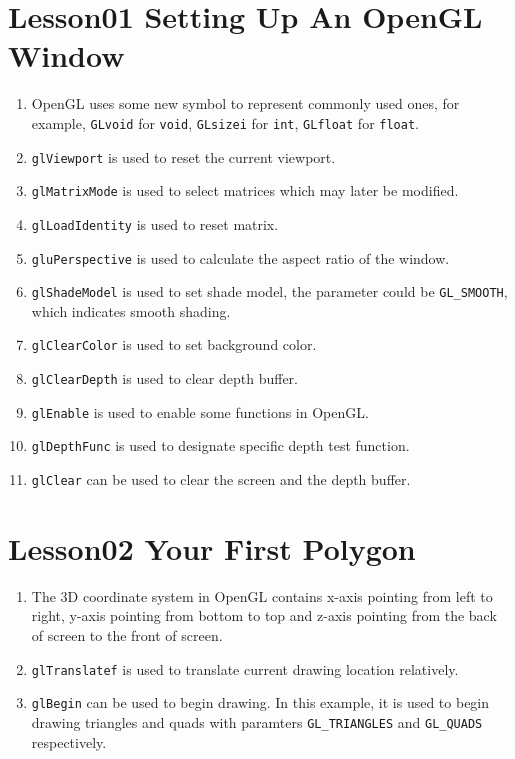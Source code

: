 \section{Lesson01 Setting Up An OpenGL Window}

\begin{enumerate}
	\item OpenGL uses some new symbol to represent commonly used ones, for example, \verb|GLvoid| for \verb|void|, \verb|GLsizei| for \verb|int|, \verb|GLfloat| for \verb|float|.
	\item \verb|glViewport| is used to reset the current viewport.
	\item \verb|glMatrixMode| is used to select matrices which may later be modified.
	\item \verb|glLoadIdentity| is used to reset matrix.
	\item \verb|gluPerspective| is used to calculate the aspect ratio of the window.
	\item \verb|glShadeModel| is used to set shade model, the parameter could be \verb|GL_SMOOTH|, which indicates smooth shading.
	\item \verb|glClearColor| is used to set background color.
	\item \verb|glClearDepth| is used to clear depth buffer.
	\item \verb|glEnable| is used to enable some functions in OpenGL.
	\item \verb|glDepthFunc| is used to designate specific depth test function.
	\item \verb|glClear| can be used to clear the screen and the depth buffer.
\end{enumerate}

\section{Lesson02 Your First Polygon}
\begin{enumerate}
	\item The 3D coordinate system in OpenGL contains x-axis pointing from left to right, y-axis pointing from bottom to top and z-axis pointing from the back of screen to the front of screen.
	\item \verb|glTranslatef| is used to translate current drawing location relatively.
	\item \verb|glBegin| can be used to begin drawing. In this example, it is used to begin drawing triangles and quads with paramters \verb|GL_TRIANGLES| and \verb|GL_QUADS| respectively.
\end{enumerate}

